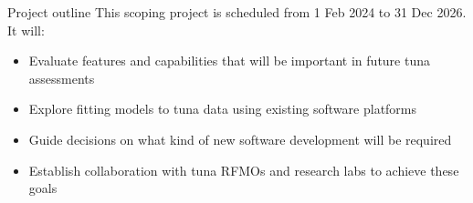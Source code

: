 \documentclass[aspectratio=169,fleqn]{beamer}
\begin{document}

\begin{frame}{Project outline}\small
  This scoping project is scheduled from 1 Feb 2024 to 31 Dec 2026. It
  will:\\[3ex]
  \begin{itemize}
    \item[] {\darkgreen Evaluate features} and capabilities that will be
    important in future tuna assessments\\[3ex]
    \item[] Explore fitting models to tuna data using {\darkgreen existing
      software platforms}\\[3ex]
    \item[] Guide decisions on what kind of
    {\darkgreen new software development} will be required\\[3ex]
    \item[] {\darkgreen Establish collaboration} with tuna RFMOs and research
    labs to achieve these goals\\[3ex]
  \end{itemize}
\end{frame}

\end{document}

